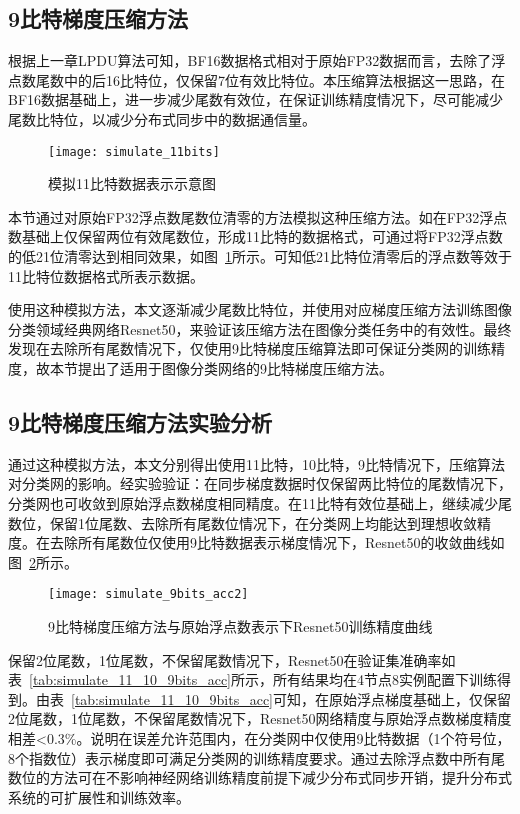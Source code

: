\subsection{9比特梯度压缩方法}
根据上一章LPDU算法可知，BF16数据格式相对于原始FP32数据而言，去除了浮点数尾数中的后16比特位，仅保留7位有效比特位。本压缩算法根据这一思路，在BF16数据基础上，进一步减少尾数有效位，在保证训练精度情况下，尽可能减少尾数比特位，以减少分布式同步中的数据通信量。
\begin{figure}[htp]
\centering
\texttt{[image: simulate\_11bits]}
\caption{模拟11比特数据表示示意图}
\label{fig:simulate_11bits}
\end{figure}

本节通过对原始FP32浮点数尾数位清零的方法模拟这种压缩方法。如在FP32浮点数基础上仅保留两位有效尾数位，形成11比特的数据格式，可通过将FP32浮点数的低21位清零达到相同效果，如图~\ref{fig:simulate_11bits}所示。可知低21比特位清零后的浮点数等效于11比特位数据格式所表示数据。

使用这种模拟方法，本文逐渐减少尾数比特位，并使用对应梯度压缩方法训练图像分类领域经典网络Resnet50，来验证该压缩方法在图像分类任务中的有效性。最终发现在去除所有尾数情况下，仅使用9比特梯度压缩算法即可保证分类网的训练精度，故本节提出了适用于图像分类网络的9比特梯度压缩方法。

\subsection{9比特梯度压缩方法实验分析}
通过这种模拟方法，本文分别得出使用11比特，10比特，9比特情况下，压缩算法对分类网的影响。经实验验证：在同步梯度数据时仅保留两比特位的尾数情况下，分类网也可收敛到原始浮点数梯度相同精度。在11比特有效位基础上，继续减少尾数位，保留1位尾数、去除所有尾数位情况下，在分类网上均能达到理想收敛精度。在去除所有尾数位仅使用9比特数据表示梯度情况下，Resnet50的收敛曲线如图~\ref{fig:simulate_9bits_acc}所示。

\begin{figure}[htp]
\centering
\texttt{[image: simulate\_9bits\_acc2]}
\caption{9比特梯度压缩方法与原始浮点数表示下Resnet50训练精度曲线}
\label{fig:simulate_9bits_acc}
\end{figure}

保留2位尾数，1位尾数，不保留尾数情况下，Resnet50在验证集准确率如表~\ref{tab:simulate_11_10_9bits_acc}所示，所有结果均在4节点8实例配置下训练得到。由表~\ref{tab:simulate_11_10_9bits_acc}可知，在原始浮点梯度基础上，仅保留2位尾数，1位尾数，不保留尾数情况下，Resnet50网络精度与原始浮点数梯度精度相差<0.3\%。说明在误差允许范围内，在分类网中仅使用9比特数据（1个符号位，8个指数位）表示梯度即可满足分类网的训练精度要求。通过去除浮点数中所有尾数位的方法可在不影响神经网络训练精度前提下减少分布式同步开销，提升分布式系统的可扩展性和训练效率。

